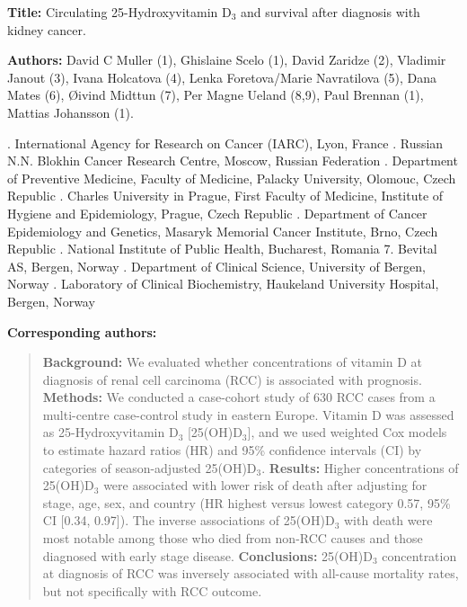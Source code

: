 \documentclass[a4paper,11pt]{article}
\begin{document}
\doublespace
\noindent \textbf{Title:} Circulating 25-Hydroxyvitamin D$_3$ and 
survival after diagnosis with kidney cancer. 

\noindent \textbf{Authors:} David C Muller (1), Ghislaine Scelo (1),  David 
Zaridze (2), Vladimir Janout (3), Ivana Holcatova (4), Lenka 
Foretova/Marie Navratilova (5), Dana Mates (6), {\O}ivind Midttun (7), 
Per Magne Ueland (8,9), Paul Brennan (1), Mattias Johansson (1).

{\footnotesize 
{}. International Agency for Research on Cancer (IARC), Lyon, France . Russian N.N. Blokhin Cancer Research Centre, Moscow, Russian Federation 
. Department of Preventive Medicine, Faculty of Medicine, Palacky University, 
Olomouc, Czech Republic . Charles University in Prague, First Faculty of Medicine, Institute of 
Hygiene 
and Epidemiology, Prague, Czech Republic . Department of Cancer Epidemiology and Genetics, Masaryk Memorial Cancer 
Institute, Brno, Czech Republic . National Institute of Public Health, Bucharest, Romania
7. Bevital AS, Bergen, Norway . Department of Clinical Science, University of Bergen, Norway . Laboratory of Clinical Biochemistry, Haukeland University Hospital, Bergen, 
Norway
}

\textbf{Corresponding authors:} 




\begin{abstract}
\noindent \textbf{Background:} We evaluated whether concentrations of vitamin 
D at diagnosis of renal cell carcinoma (RCC) is associated with prognosis.  
\newline 
\textbf{Methods:} We conducted a case-cohort study of 630 RCC cases from a 
multi-centre case-control study in eastern Europe. Vitamin D was assessed as 
25-Hydroxyvitamin D$_3$ [25(OH)D$_3$], and we used weighted Cox models to estimate 
hazard ratios (HR) and 95\% confidence intervals (CI) by categories of 
season-adjusted 25(OH)D$_3$.\newline 
\textbf{Results:} Higher concentrations of 25(OH)D$_3$ 
were associated with lower risk of death after adjusting for stage, age, sex, 
and country (HR highest versus lowest category 0.57, 95\% CI [0.34, 0.97]). The 
inverse associations of 25(OH)D$_3$ with death were most notable among those who 
died from non-RCC causes and those diagnosed with early stage disease. 
\newline 
\textbf{Conclusions:} 25(OH)D$_3$ concentration at diagnosis 
of RCC was inversely associated with all-cause mortality rates, but not specifically 
with RCC outcome. \newline

\end{abstract}
\end{document}
